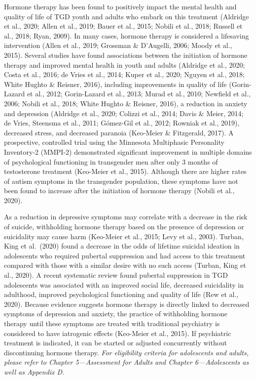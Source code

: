 \documentclass[
]{book}
\begin{document}
Hormone therapy has been found to positively
impact the mental health and quality of life of
TGD youth and adults who embark on this treatment (Aldridge et al., 2020; Allen et al., 2019;
Bauer et al., 2015; Nobili et al., 2018; Russell
et al., 2018; Ryan, 2009). In many cases, hormone
therapy is considered a lifesaving intervention
(Allen et al., 2019; Grossman \& D'Augelli, 2006;
Moody et al., 2015). Several studies have found
associations between the initiation of hormone
therapy and improved mental health in youth
and adults (Aldridge et al., 2020; Costa et al.,
2016; de Vries et al., 2014; Kuper et al., 2020;
Nguyen et al., 2018; White Hughto \& Reisner,
2016), including improvements in quality of life
(Gorin-Lazard et al., 2012; Gorin-Lazard et al.,
2013; Murad et al., 2010; Newfield et al., 2006;
Nobili et al., 2018; White Hughto \& Reisner,
2016), a reduction in anxiety and depression
(Aldridge et al., 2020; Colizzi et al., 2014; Davis
\& Meier, 2014; de Vries, Steensma et al., 2011;
Gómez-Gil et al., 2012; Rowniak et al., 2019),
decreased stress, and decreased paranoia
(Keo-Meier \& Fitzgerald, 2017). A prospective,
controlled trial using the Minnesota Multiphasic
Personality Inventory-2 (MMPI-2) demonstrated
significant improvement in multiple domains of
psychological functioning in transgender men
after only 3 months of testosterone treatment
(Keo-Meier et al., 2015). Although there are
higher rates of autism symptoms in the transgender population, these symptoms have not been
found to increase after the initiation of hormone
therapy (Nobili et al., 2020).

As a reduction in depressive symptoms may
correlate with a decrease in the risk of suicide,
withholding hormone therapy based on the presence of depression or suicidality may cause harm
(Keo-Meier et al., 2015; Levy et al., 2003). Turban,
King et al.~(2020) found a decrease in the odds
of lifetime suicidal ideation in adolescents who
required pubertal suppression and had access to
this treatment compared with those with a similar
desire with no such access (Turban, King et al.,
2020). A recent systematic review found pubertal
suppression in TGD adolescents was associated
with an improved social life, decreased suicidality
in adulthood, improved psychological functioning
and quality of life (Rew et al., 2020). Because evidence suggests hormone therapy is directly linked
to decreased symptoms of depression and anxiety,
the practice of withholding hormone therapy until
these symptoms are treated with traditional psychiatry is considered to have iatrogenic effects
(Keo-Meier et al., 2015). If psychiatric treatment
is indicated, it can be started or adjusted concurrently without discontinuing hormone therapy.
\emph{For eligibility criteria for adolescents and adults,
please refer to Chapter 5---Assessment for Adults and
Chapter 6---Adolescents as well as Appendix D.}
\end{document}
